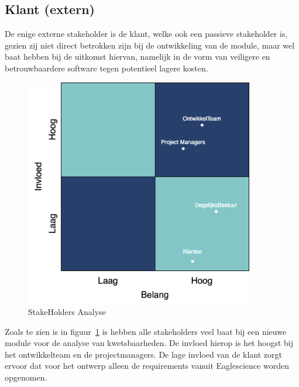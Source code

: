 \subsection{Klant (extern)}\label{subsec:klant-(extern)}
De enige externe stakeholder is de klant, welke ook een passieve stakeholder is, gezien zij niet direct betrokken zijn bij de ontwikkeling van de module, maar wel baat hebben bij de uitkomst hiervan, namelijk in de vorm van veiligere en betrouwbaardere software tegen potentieel lagere kosten.

\begin{figure}
    \myfloatalign
    \includegraphics[width=10cm]{gfx/stakeholderanalyse}
    \caption{StakeHolders Analyse}
    \label{fig:StakeholderAnalyse}
\end{figure}
Zoals te zien is in figuur~\ref{fig:StakeholderAnalyse} is hebben alle stakeholders veel baat bij een nieuwe module voor de analyse van kwetsbaarheden. De invloed hierop is het hoogst bij het ontwikkelteam en de projectmanagers. De lage invloed van de klant zorgt ervoor dat voor het ontwerp alleen de requirements vanuit Eaglescience worden opgenomen.

